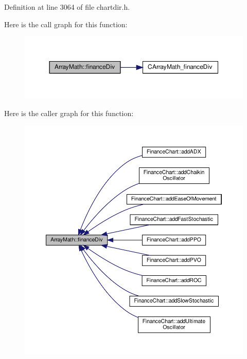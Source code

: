 Definition at line 3064 of file chartdir.\+h.

Here is the call graph for this function\+:
\nopagebreak
\begin{figure}[H]
\begin{center}
\leavevmode
\includegraphics[width=350pt]{class_array_math_a854177572cefc64f20462ad56e74038e_cgraph}
\end{center}
\end{figure}
Here is the caller graph for this function\+:
\nopagebreak
\begin{figure}[H]
\begin{center}
\leavevmode
\includegraphics[width=350pt]{class_array_math_a854177572cefc64f20462ad56e74038e_icgraph}
\end{center}
\end{figure}
\mbox{\label{class_array_math_a36c129c503f3fe99e8a92ba265eae19e}} 
